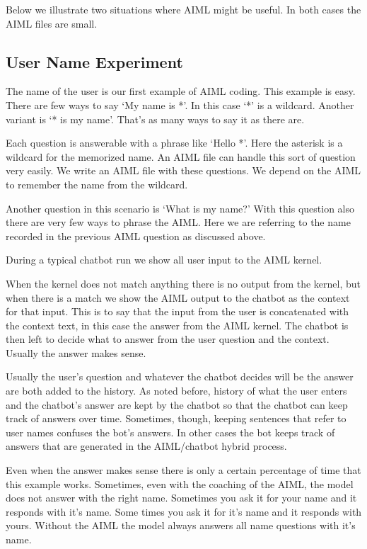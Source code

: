 Below we illustrate two situations where AIML might be useful. In both cases the AIML files are small.

\subsection{User Name Experiment}
The name of the user is our first example of AIML coding. This example is easy. There are few ways to say `My name is *'. In this case `*' is a wildcard. Another variant is `* is my name'. That's as many ways to say it as there are.

Each question is answerable with a phrase like `Hello *'. Here the asterisk is a wildcard for the memorized name. An AIML file can handle this sort of question very easily. We write an AIML file with these questions. We depend on the AIML to remember the name from the wildcard. 

Another question in this scenario is `What is my name?' With this question also there are very few ways to phrase the AIML. Here we are referring to the name recorded in the previous AIML question as discussed above. 

During a typical chatbot run we show all user input to the AIML kernel. 

When the kernel does not match anything there is no output from the kernel, but when there is a match we show the AIML output to the chatbot as the context for that input. This is to say that the input from the user is concatenated with the context text, in this case the answer from the AIML kernel. The chatbot is then left to decide what to answer from the user question and the context. Usually the answer makes sense.

Usually the user's question and whatever the chatbot decides will be the answer are both added to the history. As noted before, history of what the user enters and the chatbot's answer are kept by the chatbot so that the chatbot can keep track of answers over time. Sometimes, though, keeping sentences that refer to user names confuses the bot's answers. In other cases the bot keeps track of answers that are generated in the AIML/chatbot hybrid process.

Even when the answer makes sense there is only a certain percentage of time that this example works. Sometimes, even with the coaching of the AIML, the model does not answer with the right name. Sometimes you ask it for your name and it responds with it's name. Some times you ask it for it's name and it responds with yours. Without the AIML the model always answers all name questions with it's name. 

